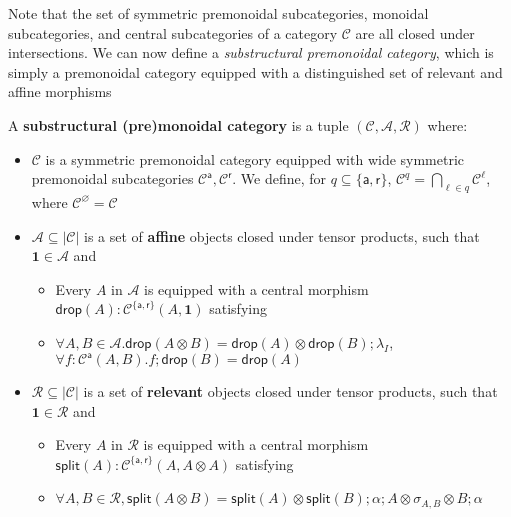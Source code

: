 \documentclass[acmsmall,screen,review]{acmart}
\newcommand{\mc}[1]{\ensuremath{\mathcal{#1}}}
\newcommand{\mb}[1]{\ensuremath{\mathbf{#1}}}
\newcommand{\ms}[1]{\ensuremath{\mathsf{#1}}}
\begin{document}
Note that the set of symmetric premonoidal subcategories, monoidal
subcategories, and central subcategories of a category \(\mc{C}\) are all closed
under intersections.
%
%
%
We can now define a \textit{substructural premonoidal category}, which is simply
a premonoidal category equipped with a distinguished set of relevant and affine
morphisms
\begin{definition}
  A \textbf{substructural (pre)monoidal category} is a tuple \((\mc{C}, \mc{A},
  \mc{R})\) where:
  \begin{itemize}
    \item \(\mc{C}\) is a symmetric premonoidal category equipped with wide
    symmetric premonoidal subcategories \(\mc{C}^{\ms{a}}, \mc{C}^{\ms{r}}\). We
    define, for \(q \subseteq \{\ms{a}, \ms{r}\}\), \(\mc{C}^q = \bigcap_{\ell
    \in q}\mc{C}^\ell\), where \(\mc{C}^\varnothing = \mc{C}\)
    \item \(\mc{A} \subseteq |\mc{C}|\) is a set of \textbf{affine} objects
    closed under tensor products, such that \(\mb{1} \in \mc{A}\) and
    \begin{itemize}
      \item Every \(A\) in \(\mc{A}\) is equipped with a central morphism
      \(\ms{drop}(A): \mc{C}^{\{\ms{a}, \ms{r}\}}(A, \mb{1})\) satisfying
      \item \(\forall A, B \in \mc{A}. \ms{drop}(A \otimes B) = \ms{drop}(A) \otimes \ms{drop}(B);\lambda_I\), \(\forall f: \mc{C}^{\ms{a}}(A, B). f;\ms{drop}(B) = \ms{drop}(A)\)
    \end{itemize}
    \item \(\mc{R} \subseteq |\mc{C}|\) is a set of \textbf{relevant} objects
    closed under tensor products, such that \(\mb{1} \in \mc{R}\) and
    \begin{itemize}
      \item Every \(A\) in \(\mc{R}\) is equipped with a central morphism
      \(\ms{split}(A): \mc{C}^{\{\ms{a}, \ms{r}\}}(A, A \otimes A)\) satisfying
      \item \(\forall A, B \in \mc{R}, \ms{split}(A \otimes B) = \ms{split}(A) \otimes \ms{split}(B);\alpha;A \otimes \sigma_{A, B} \otimes B;\alpha\)

\end{itemize}
\end{itemize}
\end{definition}
\end{document}
